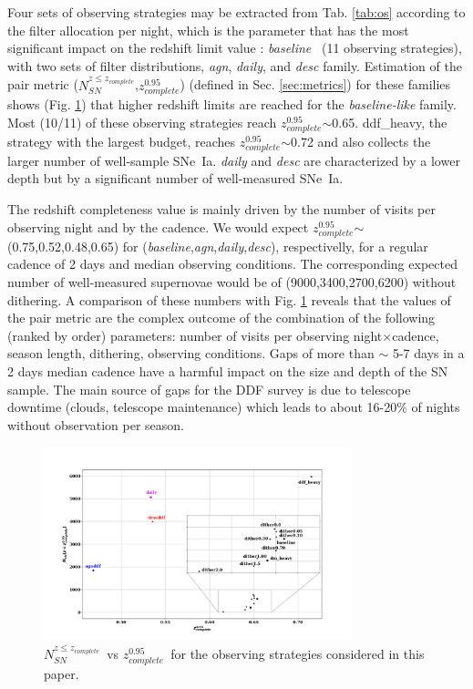 \documentclass[skiphelvet,twocolumn]{aastex63}
\newcommand{\sne}{{SNe~Ia}}
\newcommand{\nsncomp}{{$N_{SN}^{z\leq z_{complete}}$}}
\newcommand{\zcompb}{\mbox{$z_{complete}^{0.95}$}}
\newcommand{\osfamily}[1]{{\it #1}}
\begin{document}
%
%
%
%
Four sets of observing strategies may be extracted from Tab. \ref{tab:os} according to the filter allocation per night, which is the parameter that has the most significant impact on the redshift limit value : \osfamily{baseline}~ (11 observing strategies), with two sets of filter distributions, \osfamily{agn}, \osfamily{daily}, and \osfamily{desc} family. Estimation of the pair metric (\nsncomp,\zcompb) (defined in Sec. \ref{sec:metrics}) for these families shows (Fig. \ref{fig:nsn_zlim_zoom}) that higher redshift limits are reached for the \osfamily{baseline-like} family. Most (10/11) of these observing strategies reach \zcompb$\sim$0.65. ddf\_heavy, the strategy with the largest budget, reaches \zcompb$\sim$0.72 and also collects the larger number of well-sample \sne. \osfamily{daily} and \osfamily{desc} are characterized by a lower depth but by a significant number of well-measured \sne.\par
The redshift completeness value is mainly driven by the number of visits per observing night and by the cadence. We would expect \zcompb$\sim$(0.75,0.52,0.48,0.65) for (\osfamily{baseline},\osfamily{agn},\osfamily{daily},\osfamily{desc}), respectivelly, for a regular cadence of 2 days and median observing conditions. The corresponding expected number of well-measured supernovae would be of (9000,3400,2700,6200) without dithering. A comparison of these numbers with Fig. \ref{fig:nsn_zlim_zoom} reveals that the values of the pair metric %
are the complex outcome of the combination of the following (ranked by order) parameters: number of visits per observing night$\times$cadence, season length, dithering, observing conditions. Gaps of more than $\sim$ 5-7 days in a 2 days median cadence have a harmful
impact on the size and depth of the SN sample. The main source of gaps for the DDF survey is due to telescope downtime (clouds, telescope maintenance) which leads to about 16-20$\%$ of nights without observation per season.  

\begin{figure}[htbp]
\begin{center}
  \includegraphics[width=0.8\textwidth]{nsn_zlim_zoom.png}
 \caption{\nsncomp~vs \zcompb~for the observing strategies considered in this paper.}\label{fig:nsn_zlim_zoom}
\end{center}
\end{figure}
\end{document}
